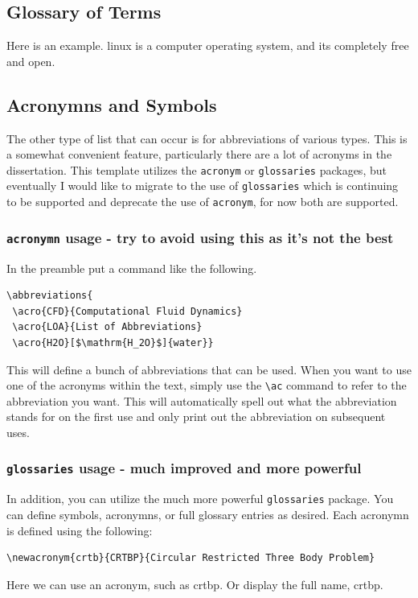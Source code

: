 \subsection{Glossary of Terms}\label{ssec:glossary}
Here is an example.
\Gls{linux} is a computer operating system, and its completely free and open.

\subsection{Acronymns and Symbols}\label{ssec:acronymns}
The other type of list that can occur is for abbreviations of various types.  
This is a somewhat convenient feature, particularly there are a lot of acronyms in the dissertation.  
This template utilizes the \texttt{acronym} or \texttt{glossaries} packages, but eventually I would like to migrate to the use of \texttt{glossaries} which is continuing to be supported and deprecate the use of \texttt{acronym}, for now both are supported. 

\subsubsection{\texttt{acronymn} usage - try to avoid using this as it's not the best}
In the preamble put a command like the following.
\begin{verbatim}
\abbreviations{
 \acro{CFD}{Computational Fluid Dynamics}
 \acro{LOA}{List of Abbreviations}
 \acro{H2O}[$\mathrm{H_2O}$]{water}}
\end{verbatim}
This will define a bunch of abbreviations that can be used.  
When you want to use one of the acronyms within the text, simply use the \verb|\ac| command to refer to the abbreviation you want.  
This will automatically spell out what the abbreviation stands for on the first use and only print out the abbreviation on subsequent uses.  

\subsubsection{\texttt{glossaries} usage - much improved and more powerful}
In addition, you can utilize the much more powerful \texttt{glossaries} package.
You can define symbols, acronymns, or full glossary entries as desired.
Each acronymn is defined using the following:
\begin{verbatim}
\newacronym{crtb}{CRTBP}{Circular Restricted Three Body Problem}
\end{verbatim}
\glsresetall
Here we can  use an acronym, such as \gls{crtbp}.
Or display the full name, \acrfull{crtbp}.

